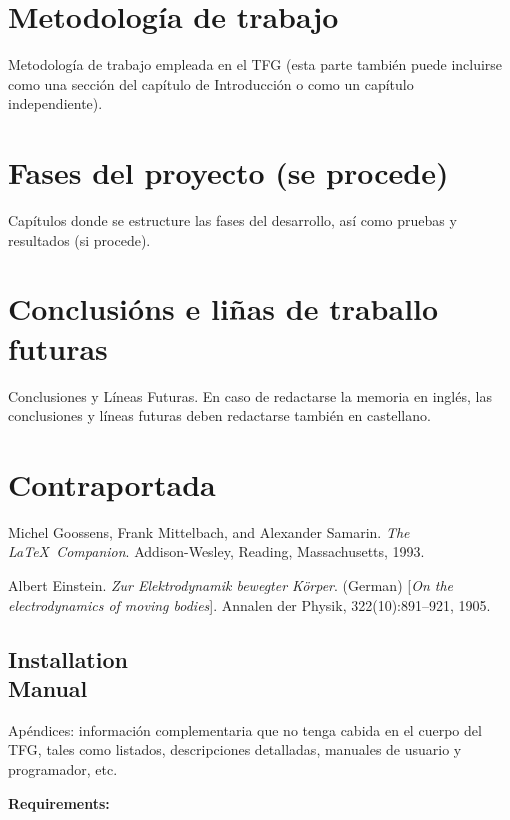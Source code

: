 \documentclass[12pt, a4paper, twoside]{article}
\begin{document}
 \section{Metodología de trabajo}
 Metodología de trabajo empleada en el TFG (esta parte también puede incluirse como una sección del capítulo de Introducción o como un capítulo independiente).

 \section{Fases del proyecto (se procede)}
 Capítulos donde se estructure las fases del desarrollo, así como pruebas y resultados (si procede). 

\section{Conclusións e liñas de traballo futuras}
Conclusiones y Líneas Futuras. En caso de redactarse la memoria en inglés, las conclusiones y líneas futuras deben redactarse también en castellano.

\section{Contraportada}
\begin{thebibliography}{9}
    Michel Goossens, Frank Mittelbach, and Alexander Samarin. 
    \textit{The \LaTeX\ Companion}. 
    Addison-Wesley, Reading, Massachusetts, 1993.
    
    Albert Einstein. 
    \textit{Zur Elektrodynamik bewegter K{\"o}rper}. (German) 
    [\textit{On the electrodynamics of moving bodies}]. 
    Annalen der Physik, 322(10):891–921, 1905.
\end{thebibliography}

\newpage

\begin{umaappendices}
\section{Installation \\ Manual}
Apéndices: información complementaria que no tenga cabida en el cuerpo del TFG, tales como listados, descripciones detalladas, manuales de usuario y programador, etc. 
    
    \textbf{\large{Requirements:}}
    
    \blindtext

\end{umaappendices}
\end{document}
